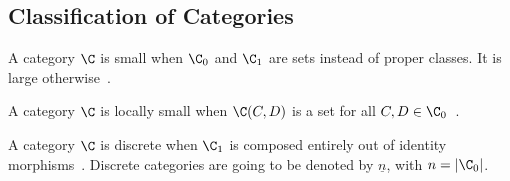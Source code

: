 \subsection{Classification of Categories}

\begin{definition}

  A category $\C$ is small when $\C_0$ and $\C_1$ are sets instead of proper
  classes. It is large otherwise~\parencite[p.~24]{awodey:category_theory}.
\end{definition}

\begin{definition}

  A category $\C$ is locally small when $\C(C, D)$ is a set for all $C,D\in
  \C_0$~\parencite[p.~25]{awodey:category_theory}.
\end{definition}

\begin{definition}

  A category $\C$ is discrete when $\C_1$ is composed entirely out of identity
  morphisms~\parencite[p.~11]{awodey:category_theory}. Discrete categories are
  going to be denoted by $\underline{n}$, with $n=|\C_0|$.
\end{definition}